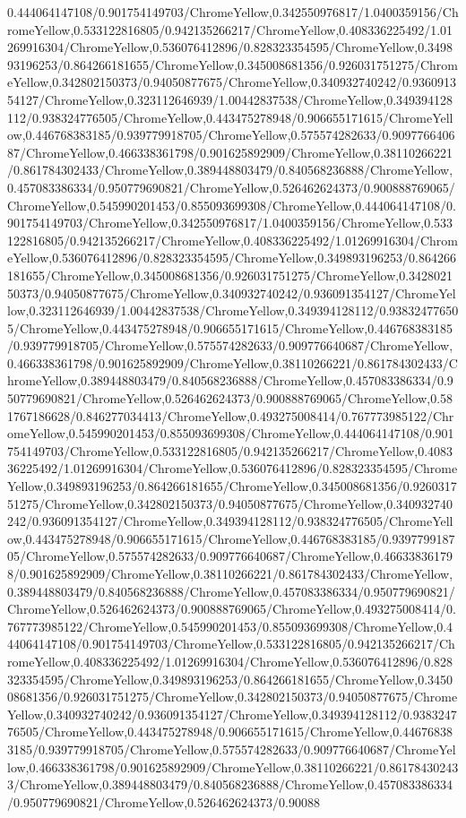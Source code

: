 {\begin{tikzternal}
{0.444064147108/0.901754149703/ChromeYellow,0.342550976817/1.0400359156/ChromeYellow,0.533122816805/0.942135266217/ChromeYellow,0.408336225492/1.01269916304/ChromeYellow,0.536076412896/0.828323354595/ChromeYellow,0.349893196253/0.864266181655/ChromeYellow,0.345008681356/0.926031751275/ChromeYellow,0.342802150373/0.94050877675/ChromeYellow,0.340932740242/0.936091354127/ChromeYellow,0.323112646939/1.00442837538/ChromeYellow,0.349394128112/0.938324776505/ChromeYellow,0.443475278948/0.906655171615/ChromeYellow,0.446768383185/0.939779918705/ChromeYellow,0.575574282633/0.909776640687/ChromeYellow,0.466338361798/0.901625892909/ChromeYellow,0.38110266221/0.861784302433/ChromeYellow,0.389448803479/0.840568236888/ChromeYellow,0.457083386334/0.950779690821/ChromeYellow,0.526462624373/0.900888769065/ChromeYellow,0.545990201453/0.855093699308/ChromeYellow,0.444064147108/0.901754149703/ChromeYellow,0.342550976817/1.0400359156/ChromeYellow,0.533122816805/0.942135266217/ChromeYellow,0.408336225492/1.01269916304/ChromeYellow,0.536076412896/0.828323354595/ChromeYellow,0.349893196253/0.864266181655/ChromeYellow,0.345008681356/0.926031751275/ChromeYellow,0.342802150373/0.94050877675/ChromeYellow,0.340932740242/0.936091354127/ChromeYellow,0.323112646939/1.00442837538/ChromeYellow,0.349394128112/0.938324776505/ChromeYellow,0.443475278948/0.906655171615/ChromeYellow,0.446768383185/0.939779918705/ChromeYellow,0.575574282633/0.909776640687/ChromeYellow,0.466338361798/0.901625892909/ChromeYellow,0.38110266221/0.861784302433/ChromeYellow,0.389448803479/0.840568236888/ChromeYellow,0.457083386334/0.950779690821/ChromeYellow,0.526462624373/0.900888769065/ChromeYellow,0.581767186628/0.846277034413/ChromeYellow,0.493275008414/0.767773985122/ChromeYellow,0.545990201453/0.855093699308/ChromeYellow,0.444064147108/0.901754149703/ChromeYellow,0.533122816805/0.942135266217/ChromeYellow,0.408336225492/1.01269916304/ChromeYellow,0.536076412896/0.828323354595/ChromeYellow,0.349893196253/0.864266181655/ChromeYellow,0.345008681356/0.926031751275/ChromeYellow,0.342802150373/0.94050877675/ChromeYellow,0.340932740242/0.936091354127/ChromeYellow,0.349394128112/0.938324776505/ChromeYellow,0.443475278948/0.906655171615/ChromeYellow,0.446768383185/0.939779918705/ChromeYellow,0.575574282633/0.909776640687/ChromeYellow,0.466338361798/0.901625892909/ChromeYellow,0.38110266221/0.861784302433/ChromeYellow,0.389448803479/0.840568236888/ChromeYellow,0.457083386334/0.950779690821/ChromeYellow,0.526462624373/0.900888769065/ChromeYellow,0.493275008414/0.767773985122/ChromeYellow,0.545990201453/0.855093699308/ChromeYellow,0.444064147108/0.901754149703/ChromeYellow,0.533122816805/0.942135266217/ChromeYellow,0.408336225492/1.01269916304/ChromeYellow,0.536076412896/0.828323354595/ChromeYellow,0.349893196253/0.864266181655/ChromeYellow,0.345008681356/0.926031751275/ChromeYellow,0.342802150373/0.94050877675/ChromeYellow,0.340932740242/0.936091354127/ChromeYellow,0.349394128112/0.938324776505/ChromeYellow,0.443475278948/0.906655171615/ChromeYellow,0.446768383185/0.939779918705/ChromeYellow,0.575574282633/0.909776640687/ChromeYellow,0.466338361798/0.901625892909/ChromeYellow,0.38110266221/0.861784302433/ChromeYellow,0.389448803479/0.840568236888/ChromeYellow,0.457083386334/0.950779690821/ChromeYellow,0.526462624373/0.90088}
\end{tikzternal}}
